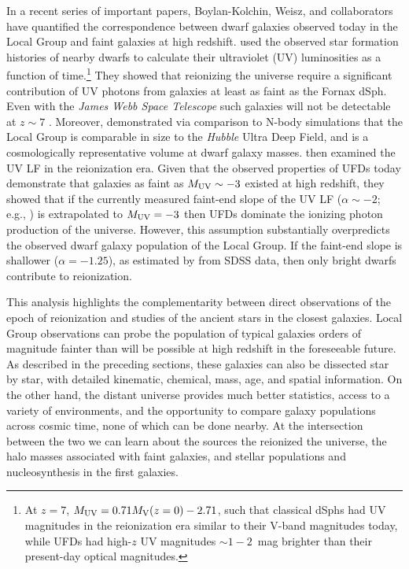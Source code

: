 \documentclass[a4paper]{ar-1col}
\begin{document}
In a recent series of important papers, Boylan-Kolchin, Weisz, and
collaborators have quantified the correspondence between dwarf
galaxies observed today in the Local Group and faint galaxies at high
redshift.  \citet{bk15} used the observed star formation histories of
nearby dwarfs to calculate their ultraviolet (UV) luminosities as a
function of time.\footnote{At $z = 7$, $M_{{\rm UV}} = 0.71 M_{{\rm
      V}} (z=0) - 2.71$, such that classical dSphs had UV magnitudes
  in the reionization era similar to their V-band magnitudes today,
  while UFDs had high-$z$ UV magnitudes $\sim1-2$~mag brighter than
  their present-day optical magnitudes.}  They showed that reionizing
the universe require a significant contribution of UV photons from
galaxies at least as faint as the Fornax dSph.  Even with the
\emph{James Webb Space Telescope} such galaxies will not be detectable
at $z \sim 7$ \citep{bk15}.  Moreover, \citet{bk16} demonstrated via
comparison to N-body simulations that the Local Group is comparable in
size to the \emph{Hubble} Ultra Deep Field, and is a cosmologically
representative volume at dwarf galaxy masses.  \citet{wbk17} then
examined the UV LF in the reionization era.  Given that the observed
properties of UFDs today demonstrate that galaxies as faint as
$M_{{\rm UV}} \sim -3$ existed at high redshift, they showed that if
the currently measured faint-end slope of the UV LF ($\alpha \sim -2$;
e.g., \citealt{livermore17}) is extrapolated to $M_{{\rm UV}} = -3$
then UFDs dominate the ionizing photon production of the universe.
However, this assumption substantially overpredicts the observed dwarf
galaxy population of the Local Group.  If the faint-end slope is
shallower ($\alpha = -1.25$), as estimated by \citet{koposov08} from
SDSS data, then only bright dwarfs contribute to reionization.

This analysis highlights the complementarity between direct
observations of the epoch of reionization and studies of the ancient
stars in the closest galaxies.  Local Group observations can probe the
population of typical galaxies orders of magnitude fainter than will
be possible at high redshift in the foreseeable future.  As described
in the preceding sections, these galaxies can also be dissected star
by star, with detailed kinematic, chemical, mass, age, and spatial
information.  On the other hand, the distant universe provides much
better statistics, access to a variety of environments, and the
opportunity to compare galaxy populations across cosmic time, none of
which can be done nearby.  At the intersection between the two we can
learn about the sources the reionized the universe, the halo masses
associated with faint galaxies, and stellar populations and
nucleosynthesis in the first galaxies.
\end{document}
